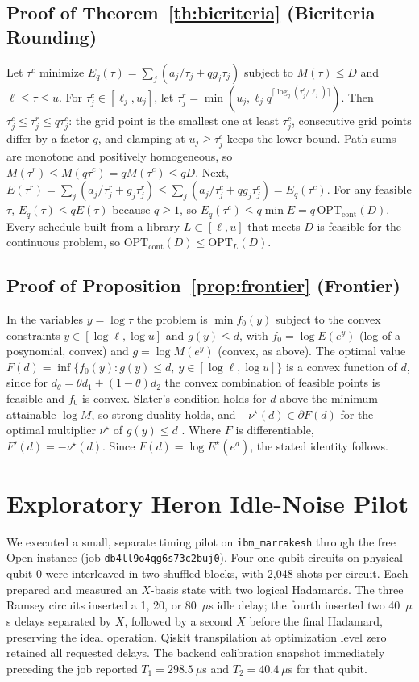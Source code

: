 \documentclass[10pt,letterpaper,journal]{IEEEtran}
\begin{document}
\subsection{Proof of Theorem~\ref{th:bicriteria} (Bicriteria Rounding)}
Let $\tau^c$ minimize $E_q(\tau)=\sum_j(a_j/\tau_j+qg_j\tau_j)$ subject to $M(\tau)\le D$ and $\ell\le\tau\le u$. For $\tau^c_j\in[\ell_j,u_j]$, let $\tau^r_j=\min(u_j,\ell_jq^{\lceil\log_q(\tau^c_j/\ell_j)\rceil})$. Then $\tau^c_j\le\tau^r_j\le q\tau^c_j$: the grid point is the smallest one at least $\tau^c_j$, consecutive grid points differ by a factor $q$, and clamping at $u_j\ge\tau^c_j$ keeps the lower bound. Path sums are monotone and positively homogeneous, so $M(\tau^r)\le M(q\tau^c)=qM(\tau^c)\le qD$. Next, $E(\tau^r)=\sum_j(a_j/\tau^r_j+g_j\tau^r_j)\le\sum_j(a_j/\tau^c_j+qg_j\tau^c_j)=E_q(\tau^c)$. For any feasible $\tau$, $E_q(\tau)\le qE(\tau)$ because $q\ge1$, so $E_q(\tau^c)\le q\min E=q\,\mathrm{OPT}_{\mathrm{cont}}(D)$. Every schedule built from a library $L\subset[\ell,u]$ that meets $D$ is feasible for the continuous problem, so $\mathrm{OPT}_{\mathrm{cont}}(D)\le\mathrm{OPT}_L(D)$.

\subsection{Proof of Proposition~\ref{prop:frontier} (Frontier)}
In the variables $y=\log\tau$ the problem is $\min f_0(y)$ subject to the convex constraints $y\in[\log\ell,\log u]$ and $g(y)\le d$, with $f_0=\log E(e^y)$ (log of a posynomial, convex) and $g=\log M(e^y)$ (convex, as above). The optimal value $F(d)=\inf\{f_0(y):g(y)\le d,\ y\in[\log\ell,\log u]\}$ is a convex function of $d$, since for $d_\theta=\theta d_1+(1-\theta)d_2$ the convex combination of feasible points is feasible and $f_0$ is convex. Slater's condition holds for $d$ above the minimum attainable $\log M$, so strong duality holds, and $-\nu^\star(d)\in\partial F(d)$ for the optimal multiplier $\nu^\star$ of $g(y)\le d$ \cite[\S5.6]{boydbook}. Where $F$ is differentiable, $F'(d)=-\nu^\star(d)$. Since $F(d)=\log E^\star(e^d)$, the stated identity follows.

\section{Exploratory Heron Idle-Noise Pilot}\label{app:idle_pilot}
We executed a small, separate timing pilot on \texttt{ibm\_marrakesh} through the free Open instance (job \texttt{db4ll9o4qg6s73c2buj0}). Four one-qubit circuits on physical qubit 0 were interleaved in two shuffled blocks, with 2,048 shots per circuit. Each prepared and measured an $X$-basis state with two logical Hadamards. The three Ramsey circuits inserted a 1, 20, or 80~$\mu$s idle delay; the fourth inserted two 40~$\mu$s delays separated by $X$, followed by a second $X$ before the final Hadamard, preserving the ideal operation. Qiskit transpilation at optimization level zero retained all requested delays. The backend calibration snapshot immediately preceding the job reported $T_1=298.5~\mu$s and $T_2=40.4~\mu$s for that qubit.
\end{document}
